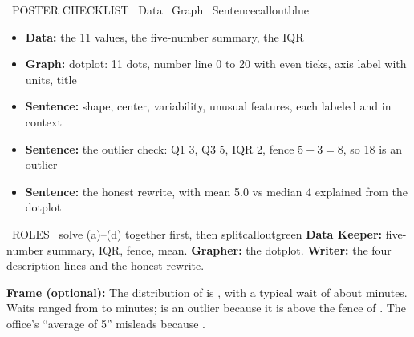 \newpage
\begin{callout}{\IconTarget\ POSTER CHECKLIST \textperiodcentered\ Data \textperiodcentered\ Graph \textperiodcentered\ Sentence}{calloutblue}
\begin{itemize}[leftmargin=1.6em,itemsep=1pt,topsep=1pt]
  \item[$\square$] \textbf{Data:} the 11 values, the five-number summary, the IQR
  \item[$\square$] \textbf{Graph:} dotplot: 11 dots, number line 0 to 20 with even ticks, axis label with units, title
  \item[$\square$] \textbf{Sentence:} shape, center, variability, unusual features, each labeled and in context
  \item[$\square$] \textbf{Sentence:} the outlier check: Q1 3, Q3 5, IQR 2, fence $5 + 3 = 8$, so 18 is an outlier
  \item[$\square$] \textbf{Sentence:} the honest rewrite, with mean 5.0 vs median 4 explained from the dotplot
\end{itemize}
\posterrule
\end{callout}

\begin{callout}{\IconPuzzle\ ROLES \textperiodcentered\ solve (a)--(d) together first, then split}{calloutgreen}
\textbf{Data Keeper:} five-number summary, IQR, fence, mean.\quad
\textbf{Grapher:} the dotplot.\quad
\textbf{Writer:} the four description lines and the honest rewrite.
\end{callout}


\begin{sentenceframebox}[top=3pt,bottom=3pt]\raggedright\textbf{Frame (optional):} The distribution of  is , with a typical wait of about  minutes. Waits ranged from  to  minutes;  is an outlier because it is above the fence of . The office's ``average of 5'' misleads because .\end{sentenceframebox}

